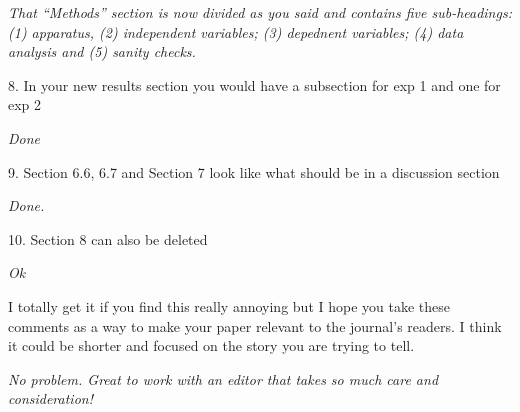\documentclass[journal]{IEEEtran}
\newenvironment{changed}{\par}{\par}
\begin{document}
{\em That ``Methods'' section is now divided as you said and  contains 
five sub-headings: (1) apparatus, (2) independent variables;
(3) depednent variables; (4) data analysis and (5) sanity checks.

}

8.      In your new results section you would have a subsection for exp 1 and one for exp 2

{\em Done}

9.      Section 6.6, 6.7 and Section 7 look like what should be in a discussion section

{\em Done.}

10.  Section 8 can also be deleted

{\em Ok}

I totally get it if you find this really annoying
but I hope you take these comments as a way to make
your paper relevant to the journal’s readers. I
think it could be shorter and focused on the story
you are trying to tell.

{\em No problem. Great to work with an editor that takes so much care and consideration!}







\end{document}
